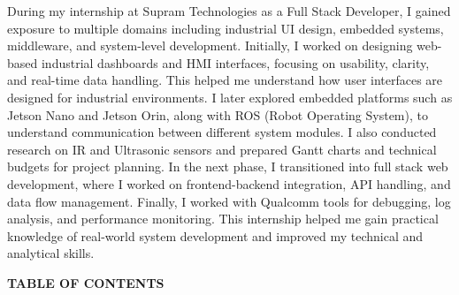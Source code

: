 \documentclass[12pt,a4paper]{report}
\begin{document}
During my internship at Supram Technologies as a Full Stack Developer, I gained exposure to multiple domains including industrial UI design, embedded systems, middleware, and system-level development. Initially, I worked on designing web-based industrial dashboards and HMI interfaces, focusing on usability, clarity, and real-time data handling. This helped me understand how user interfaces are designed for industrial environments. I later explored embedded platforms such as Jetson Nano and Jetson Orin, along with ROS (Robot Operating System), to understand communication between different system modules. I also conducted research on IR and Ultrasonic sensors and prepared Gantt charts and technical budgets for project planning. In the next phase, I transitioned into full stack web development, where I worked on frontend-backend integration, API handling, and data flow management. Finally, I worked with Qualcomm tools for debugging, log analysis, and performance monitoring. This internship helped me gain practical knowledge of real-world system development and improved my technical and analytical skills.


\newpage
\begin{center}
{\Large \textbf{TABLE OF CONTENTS}\par}
\end{center}
\end{document}
